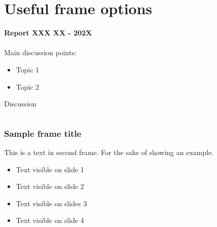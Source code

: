 \documentclass[8pt]{beamer}
\begin{document}
	\begin{frame}{}
		
	\end{frame}

	\begin{frame}
	\end{frame}
	\section*{Useful frame options}
	\label{}
	\justifying
	\begin{frame}
		\textbf{Report XXX XX - 202X}\\~\\
		Main discussion points:
		\begin{itemize}
			\item Topic 1
			\item Topic 2
		\end{itemize}
	\end{frame}

	\begin{frame}{Discussion}
		\begin{columns}
			
			
			
			
		\end{columns}
	\end{frame}
	\begin{frame}
	\end{frame}
	\begin{frame}
	\end{frame}
	\begin{frame}
	\end{frame}
	\begin{frame}
		\frametitle{Sample frame title}
		This is a text in second frame. For the sake of showing an example.
		
		\begin{itemize}
			\item<1-> Text visible on slide 1
			\item<2-> Text visible on slide 2
			\item<3> Text visible on slides 3
			\item<4-> Text visible on slide 4
		\end{itemize}
	\end{frame}
	
\end{document}
